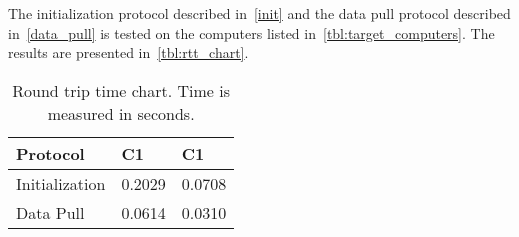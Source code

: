 The initialization protocol described in~\autoref{init} and the data pull protocol described in~\autoref{data_pull} is tested on the computers listed in~\autoref{tbl:target_computers}.
The results are presented in~\autoref{tbl:rtt_chart}.
\begin{table}[h]
  \begin{tabular}{lll}
  Protocol                                & C1                    & C1                      \\ \hline
  Initialization                          & 0.2029                & 0.0708                  \\ %
  Data Pull                               & 0.0614                & 0.0310                  \\ %
  \end{tabular}
  \caption{Round trip time chart. Time is measured in seconds.}
  \label{tbl:rtt_chart}
\end{table}
